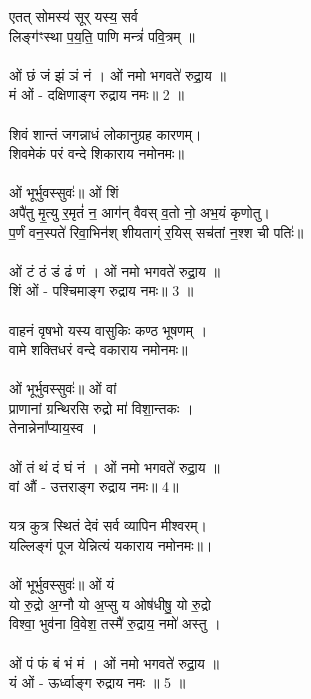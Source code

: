 एतत्  सोमस्य॑ सूर् यस्य॒ सर्व\\
लिङ्ग॑ꣳस्था प॒य॒ति॒ पाणि मन्त्रं॑ पवि॒त्रम् ॥\\
\\
ओं छं जं झं ञं नं । ओं नमो भगवते॑ रुद्रा॒य ॥\\
मं ओं - दक्षिणाङ्ग रुद्राय नमः॥ 2 ॥\\
\\
शिवं शान्तं जगन्नाधं लोकानुग्रह कारणम्।\\
शिवमेकं परं वन्दे शिकाराय नमोनमः॥\\
\\
ओं भूर्भुवस्सुवः॑॥ ओं शिं \\
अपै॑तु मृ॒त्यु र॒मृतं॑ न॒ आग॑न् वैवस् व॒तो नो॒ अभ॒यं कृणोतु।\\
प॒र्णं वन॒स्पते॑ रिवा॒भिन॑श् शीयताग्ं र॒यिस् सच॑तां न॒श्श ची पतिः॑॥\\
\\
ओं  टं ठं डं ढं णं । ओं नमो भगवते॑ रुद्रा॒य ॥\\
शिं ओं - पश्चिमाङ्ग रुद्राय नमः॥ 3 ॥ \\
\\
वाहनं वृषभो यस्य वासुकिः कण्ठ भूषणम् ।\\
वामे शक्तिधरं वन्दे वकाराय नमोनमः॥\\
\\
ओं भूर्भुवस्सुवः॑॥ ओं वां \\
प्राणानां ग्रन्थिरसि रुद्रो मा॑ विशा॒न्तकः ।\\
तेनान्नेना᳚प्याय॒स्व ।\\
\\
ओं  तं थं दं घं नं । ओं नमो भगवते॑ रुद्रा॒य ॥\\
वां औं - उत्तराङ्ग रुद्राय नमः॥ 4॥\\
\\
यत्र कुत्र स्थितं देवं सर्व व्यापिन मीश्वरम्।\\
यल्लिङ्गं पूज येन्नित्यं यकाराय नमोनमः॥।\\
\\
ओं भूर्भुवस्सुवः॑॥ ओं यं\\
यो रु॒द्रो अ॒ग्नौ यो अ॒प्सु य ओष॑धीषु॒ यो रु॒द्रो\\
विश्वा॒ भुव॑ना वि॒वेश॒ तस्मै॑ रु॒द्राय॒ नमो॑ अस्तु ।\\
\\
ओं पं फं बं भं मं । ओं नमो भगवते॑ रुद्रा॒य ॥\\
यं ओं - ऊर्ध्वाङ्ग रुद्राय नमः ॥ 5 ॥\\
